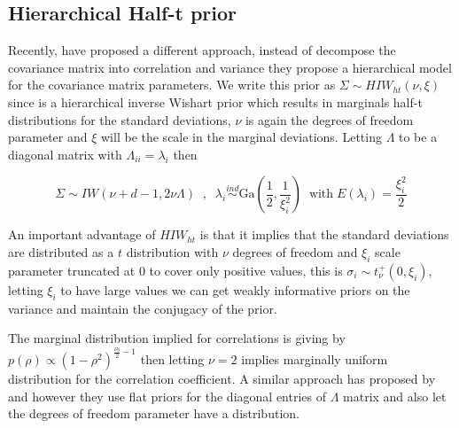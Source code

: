 \documentclass[a4paper]{article}
\begin{document}
\subsection{Hierarchical Half-t prior}

Recently, \cite{huang2013simple} have proposed a different approach, instead of decompose the covariance matrix into correlation and variance they propose a hierarchical model for the covariance matrix parameters. We write this prior as $\Sigma \sim HIW_{ht}(\nu, \xi)$ since is a hierarchical inverse Wishart prior which results in marginals half-t distributions for the standard deviations, $\nu$ is again the degrees of freedom parameter and $\xi$ will be the scale in the marginal deviations.   Letting  $\Lambda$ to be a diagonal matrix with $\Lambda_{ii} =\lambda_i $ then

\begin{equation}
\Sigma \sim IW( \nu + d - 1 ,  2\nu\Lambda) \;\;,\;\;  \lambda_i  \stackrel{ind} \sim \mbox{Ga}(\frac{1}{2} , \frac{1}{\xi_i^2}) \;\; \mbox{with} \; E(\lambda_i)=\frac{\xi_i^2}{2} 
\label{eq:ht}
\end{equation}

An important advantage of  $HIW_{ht}$ is that it implies that the standard deviations are distributed as a $t$ distribution with $\nu$ degrees of freedom and $\xi_i$ scale parameter truncated at 0 to cover only positive values, this is $\sigma_i \sim t_{\nu}^{+}(0, \xi_i)$, letting $\xi_i$ to have large values we can get weakly informative priors on the variance and maintain the conjugacy of the prior.  

The marginal distribution implied for correlations is giving by $p(\rho) \propto (1-\rho^2)^{\frac{\nu_0}{2}-1}$ then letting $\nu=2$ implies marginally uniform distribution for the correlation coefficient. 
A similar approach has proposed by \cite{daniels1999} and \cite{matilde} however they use flat priors for the diagonal entries of $\Lambda$ matrix and also let the degrees of freedom parameter have a distribution.
 
\end{document}
